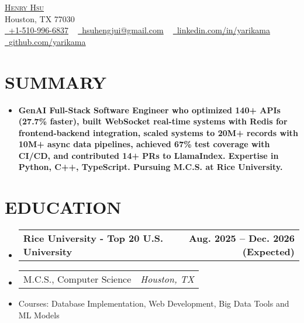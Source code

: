 \documentclass[letterpaper,11pt]{article}
\makeatletter
\newcommand{\mylocation}{
  Houston, TX 77030
}
\newcommand{\resumeItem}[1]{
  \item\small{#1}
}
\newcommand{\resumeSubheadingnull}[2]{
  \item
    \begin{tabular*}{1.0\textwidth}[t]{l@{\extracolsep{\fill}}r}
      \textbf{#1} & \textbf{\small #2} \\
    \end{tabular*}\vspace{3pt}
}
\newcommand{\resumeSubItema}[2]{
  \item
    \begin{tabular*}{1.0\textwidth}[t]{l@{\extracolsep{\fill}}r}
      \small#1 & \textit{\small #2} \\
    \end{tabular*}
}
\newcommand{\resumeSubItem}[1]{\resumeItem{#1}}
\newcommand{\resumeSubHeadingListStart}{\begin{itemize}[leftmargin=0.0in, label={}]}
\newcommand{\resumeSubHeadingListEnd}{\end{itemize}}
\makeatother
\begin{document}

\begin{center}
	{\Huge \scshape \href{https://yarikama.world}{Henry Hsu}} \\
    {\small\color{gray} \mylocation} \\
	\href{tel:+1-510-996-6837}{\raisebox{-0.2\height}\faPhone\  \underline{+1-510-996-6837}} ~
	\href{mailto:hsuhengjui@gmail.com}{\raisebox{-0.2\height}\faEnvelope\  \underline{hsuhengjui@gmail.com}} ~
	\href{https://linkedin.com/in/yarikama/}{\raisebox{-0.2\height}\faLinkedin\ \underline{linkedin.com/in/yarikama}}  ~
	\href{https://github.com/yarikama}{\raisebox{-0.2\height}\faGithub\ \underline{github.com/yarikama}}
	\vspace{-8pt}
\end{center}

\section{SUMMARY}
\resumeSubHeadingListStart
\item\small{\textbf{GenAI Full-Stack Software Engineer who optimized 140+ APIs (27.7\% faster), built WebSocket real-time systems with Redis for frontend-backend integration, scaled systems to 20M+ records with 10M+ async data pipelines, achieved 67\% test coverage with CI/CD, and contributed 14+ PRs to LlamaIndex. Expertise in Python, C++, TypeScript. Pursuing M.C.S. at Rice University.}}
\vspace{-2pt}
\resumeSubHeadingListEnd


\section{EDUCATION}
\resumeSubHeadingListStart
\resumeSubheadingnull
{Rice University - Top 20 U.S. University}{Aug. 2025 -- Dec. 2026 (Expected)}{}{}
\vspace{-20pt}
\resumeSubItema{M.C.S., Computer Science}{Houston, TX}
\vspace{-15pt}
\resumeSubItem{Courses: Database Implementation, Web Development, Big Data Tools and ML Models}
\vspace{-2pt}
\resumeSubHeadingListEnd
\end{document}
